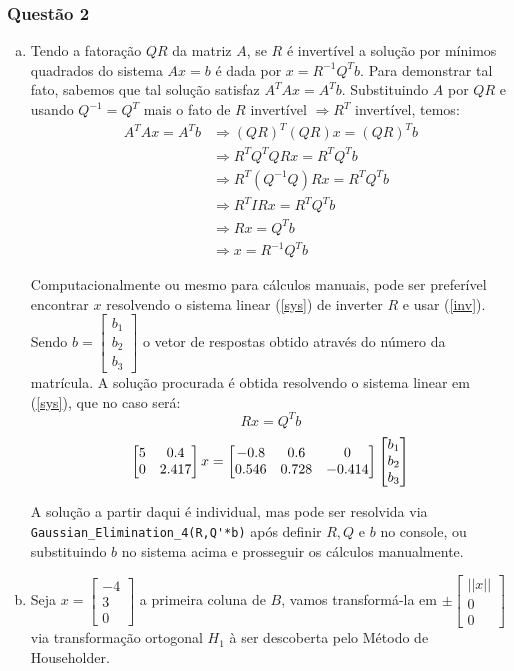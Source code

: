 \documentclass[12pt]{article}
\begin{document}
	\subsubsection*{Questão 2}
	\begin{enumerate}[a)]
		\item Tendo a fatoração $QR$ da matriz $A$, se $R$ é invertível a solução por mínimos quadrados do sistema $Ax=b$ é dada por $x=R^{-1}Q^Tb$. Para demonstrar tal fato, sabemos que tal solução satisfaz $A^TAx=A^Tb$. Substituindo $A$ por $QR$ e usando $Q^{-1}=Q^T$ mais o fato de $R$ invertível $\Rightarrow R^T$ invertível, temos:
		\begin{align}
			A^TAx=A^Tb&\Rightarrow (QR)^T(QR)x=(QR)^Tb\nonumber\\
			&\Rightarrow R^TQ^TQRx=R^TQ^Tb\nonumber\\
			&\Rightarrow R^T(Q^{-1}Q)Rx=R^TQ^Tb\nonumber\\
			&\Rightarrow R^TIRx=R^TQ^Tb\nonumber\\
			&\Rightarrow Rx=Q^Tb\label{sys}\\
			&\Rightarrow x=R^{-1}Q^Tb\label{inv}
		\end{align}
	
	Computacionalmente ou mesmo para cálculos manuais, pode ser preferível encontrar $x$ resolvendo o sistema linear (\ref{sys}) de inverter $R$ e usar (\ref{inv}).
	Sendo $b=\begin{bmatrix}
		b_1\\b_2\\b_3
	\end{bmatrix}$ o vetor de respostas obtido através do número da matrícula. A solução procurada é obtida resolvendo o sistema linear em (\ref{sys}), que no caso será:
\[Rx=Q^Tb\]
\[\begin{bmatrix}5&0.4\cr 0&2.417\cr \end{bmatrix}x=\begin{bmatrix}-0.8&0.6&0\cr 0.546&0.728&-0.414\cr \end{bmatrix}\begin{bmatrix}
	b_1\\b_2\\b_3
\end{bmatrix}\]

A solução a partir daqui é individual, mas pode ser resolvida via \lstinline|Gaussian_Elimination_4(R,Q'*b)| após definir $R,Q$ e $b$ no console, ou substituindo $b$ no sistema acima e prosseguir os cálculos manualmente.

\item Seja $x=\begin{bmatrix}
	-4\\3\\0
\end{bmatrix}$ a primeira coluna de $B$, vamos transformá-la em $\pm\begin{bmatrix}
||x||\\0\\0
\end{bmatrix}$ via transformação ortogonal $H_1$ à ser descoberta pelo Método de Householder.


\end{enumerate}
\end{document}
